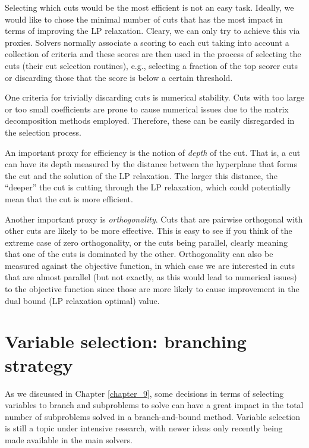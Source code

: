 Selecting which cuts would be the most efficient is not an easy task. Ideally, we would like to chose the minimal number of cuts that has the most impact in terms of improving the LP relaxation. Cleary, we can only try to achieve this via proxies. Solvers normally associate a scoring to each cut taking into account a collection of criteria and these scores are then used in the process of selecting the cuts (their cut selection routines), e.g., selecting a fraction of the top scorer cuts or discarding those that the score is below a certain threshold.

One criteria for trivially discarding cuts is numerical stability. Cuts with too large or too small coefficients are prone to cause numerical issues due to the matrix decomposition methods employed. Therefore, these can be easily disregarded in the selection process. 

An important proxy for efficiency is the notion of \emph{depth} of the cut. That is, a cut can have its depth measured by the distance between the hyperplane that forms the cut and the solution of the LP relaxation. The larger this distance, the ``deeper'' the cut is cutting through the LP relaxation, which could potentially mean that the cut is more efficient. 

Another important proxy is \emph{orthogonality}. Cuts that are pairwise orthogonal with other cuts are likely to be more effective. This is easy to see if you think of the extreme case of zero orthogonality, or the cuts being parallel, clearly meaning that one of the cuts is dominated by the other. Orthogonality can also be measured against the objective function, in which case we are interested in cuts that are almost parallel (but not exactly, as this would lead to numerical issues) to the objective function since those are more likely to cause improvement in the dual bound (LP relaxation optimal) value.


\section{Variable selection: branching strategy}

As we discussed in Chapter \ref{chapter_9}, some decisions in terms of selecting variables to branch and subproblems to solve can have a great impact in the total number of subproblems solved in a branch-and-bound method. Variable selection is still a topic under intensive research, with newer ideas only recently being made available in the main solvers. 

